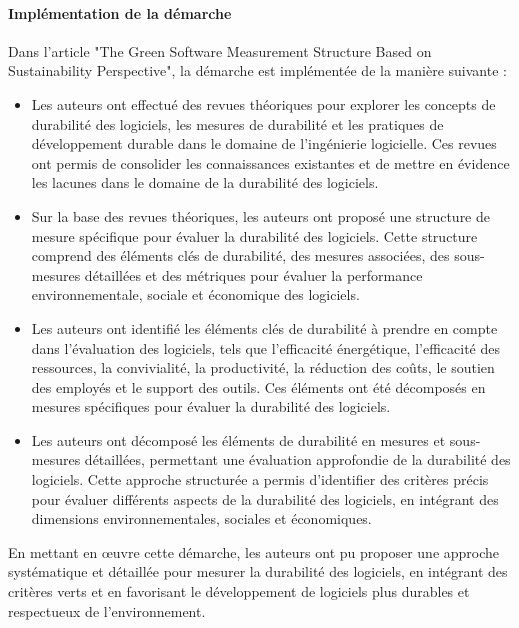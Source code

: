 \paragraph{Implémentation de la démarche}
Dans l'article "The Green Software Measurement Structure Based on Sustainability Perspective", la démarche est implémentée de la manière suivante :
\begin{itemize}
    \item Les auteurs ont effectué des revues théoriques pour explorer les concepts de durabilité des logiciels, les mesures de durabilité et les pratiques de développement durable dans le domaine de l'ingénierie logicielle. Ces revues ont permis de consolider les connaissances existantes et de mettre en évidence les lacunes dans le domaine de la durabilité des logiciels.
    \item Sur la base des revues théoriques, les auteurs ont proposé une structure de mesure spécifique pour évaluer la durabilité des logiciels. Cette structure comprend des éléments clés de durabilité, des mesures associées, des sous-mesures détaillées et des métriques pour évaluer la performance environnementale, sociale et économique des logiciels.
    \item Les auteurs ont identifié les éléments clés de durabilité à prendre en compte dans l'évaluation des logiciels, tels que l'efficacité énergétique, l'efficacité des ressources, la convivialité, la productivité, la réduction des coûts, le soutien des employés et le support des outils. Ces éléments ont été décomposés en mesures spécifiques pour évaluer la durabilité des logiciels.
    \item Les auteurs ont décomposé les éléments de durabilité en mesures et sous-mesures détaillées, permettant une évaluation approfondie de la durabilité des logiciels. Cette approche structurée a permis d'identifier des critères précis pour évaluer différents aspects de la durabilité des logiciels, en intégrant des dimensions environnementales, sociales et économiques.
\end{itemize}
En mettant en œuvre cette démarche, les auteurs ont pu proposer une approche systématique et détaillée pour mesurer la durabilité des logiciels, en intégrant des critères verts et en favorisant le développement de logiciels plus durables et respectueux de l'environnement.

